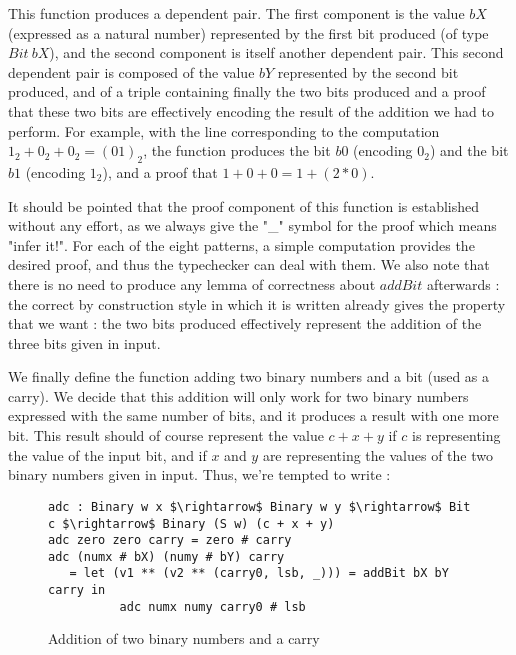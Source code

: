 This function produces a dependent pair. The first component is the value $bX$ (expressed as a natural number) represented by the first bit produced (of type $Bit\ bX$), and the second component is itself another dependent pair. This second dependent pair is composed of the value $bY$ represented by the second bit produced, and of a triple containing finally the two bits produced and a proof that these two bits are effectively encoding the result of the addition we had to perform.
For example, with the line corresponding to the computation $1_2 + 0_2 + 0_2 = (01)_2$, the function produces the bit $b0$ (encoding $0_2$) and the bit $b1$ (encoding $1_2$), and a proof that $1 + 0 + 0 = 1 + (2*0)$.

It should be pointed that the proof component of this function is established without any effort, as we always give the "\_" symbol for the proof which means "infer it!". For each of the eight patterns, a simple computation provides the desired proof, and thus the typechecker can deal with them.
We also note that there is no need to produce any lemma of correctness about $addBit$ afterwards : the correct by construction style in which it is written already gives the property that we want : the two bits produced effectively represent the addition of the three bits given in input.

We finally define the function adding two binary numbers and a bit (used as a carry). We decide that this addition will only work for two binary numbers expressed with the same number of bits, and it produces a result with one more bit. This result should of course represent the value $c + x + y$ if $c$ is representing the value of the input bit, and if $x$ and $y$ are representing the values of the two binary numbers given in input. Thus, we're tempted to write :
\begin{figure}[H]
\figrule
\begin{center}
\begin{lstlisting}
adc : Binary w x $\rightarrow$ Binary w y $\rightarrow$ Bit c $\rightarrow$ Binary (S w) (c + x + y)
adc zero zero carry = zero # carry
adc (numx # bX) (numy # bY) carry
   = let (v1 ** (v2 ** (carry0, lsb, _))) = addBit bX bY carry in
          adc numx numy carry0 # lsb
\end{lstlisting}
\end{center}
\caption{Addition of two binary numbers and a carry}
\figrule
\end{figure}


